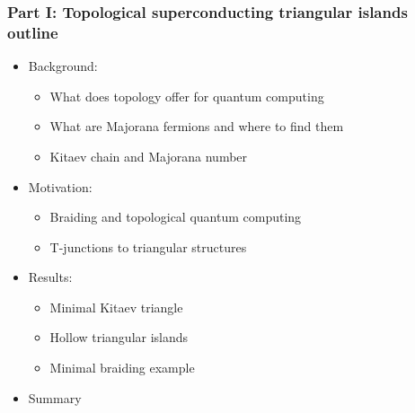 \documentclass[xcolor=dvipsnames,10pt,aspectratio=169]{beamer}
\newcommand{\BD}{Background}
\newcommand{\MO}{Motivation}
\newcommand{\RE}{Results}
\newcommand{\CO}{Summary}
\begin{document}
  \begin{frame}
  \frametitle{Part I: Topological superconducting triangular islands outline}
    \begin{itemize}
      \item \BD:
        \begin{itemize}
          \footnotesize
          \item What does topology offer for quantum computing
          \item What are Majorana fermions and where to find them
          \item Kitaev chain and Majorana number
        \end{itemize}
      \item \MO:
        \begin{itemize}
          \footnotesize
          \item Braiding and topological quantum computing
          \item T-junctions to triangular structures
        \end{itemize}
      \item \RE:
        \begin{itemize}
          \footnotesize
          \item Minimal Kitaev triangle
          \item Hollow triangular islands
          \item Minimal braiding example
        \end{itemize}
      \item \CO
    \end{itemize}
  \end{frame}
\end{document}
